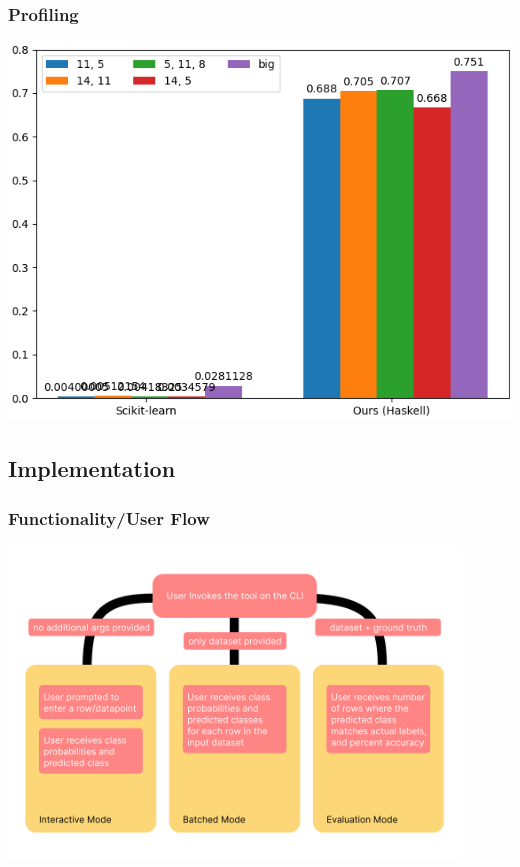 \documentclass{beamer}
\begin{document}
\begin{frame}
  \frametitle{Profiling}
  \begin{center}
    \includegraphics[width=\textwidth]{../images/benchmark.png}
  \end{center}
\end{frame}

\subsection{Implementation}

\begin{frame}
  \frametitle{Functionality/User Flow}

  \begin{center}
    \includegraphics[width=0.9\textwidth]{../images/UserFlow.png}
  \end{center}
\end{frame}
\end{document}
